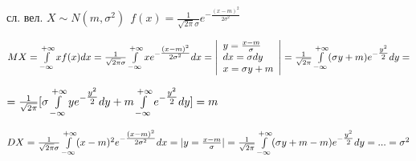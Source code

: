  сл. вел. $X\sim N(m,\sigma^2)~~ f(x)=\tfrac{1}{\sqrt{2\pi}\sigma}e^{-\tfrac{(x-m)^2}{2\sigma^2}}$

$MX=\int\limits_{-\infty}^{+\infty}xf(x)dx=\tfrac{1}{\sqrt{2\pi}\sigma}\int\limits_{-\infty}^{+\infty}xe^{-\tfrac{(x-m)^2}{2\sigma^2}}dx=\left|\begin{array}{l}
	y=\tfrac{x-m}{\sigma}\\
	dx=\sigma dy\\
	x=\sigma y+m
\end{array}\right|=\tfrac{1}{\sqrt{2\pi}}\int\limits_{-\infty}^{+\infty}(\sigma y+m)e^{-\tfrac{y^2}{2}}dy=$

$=\tfrac{1}{\sqrt{2\pi}}[\sigma\int\limits_{-\infty}^{+\infty}ye^{-\tfrac{y^2}{2}}dy+m\int\limits_{-\infty}^{+\infty}e^{-\tfrac{y^2}{2}}dy]=m$

$DX=\tfrac{1}{\sqrt{2\pi}\sigma}\int\limits_{-\infty}^{+\infty}(x-m)^2e^{-\tfrac{(x-m)^2}{2\sigma^2}}dx=|y=\tfrac{x-m}{\sigma}|=\tfrac{1}{\sqrt{2\pi}}\int\limits_{-\infty}^{+\infty}(\sigma y+m-m)e^{-\tfrac{y^2}{2}}dy=...=\sigma^2$

\clearpage
